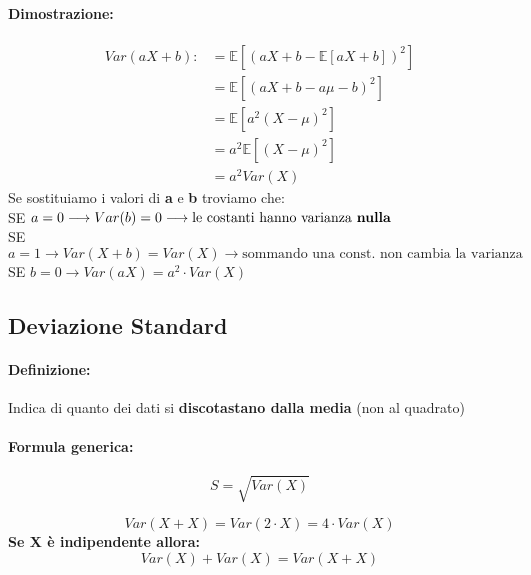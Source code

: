 \documentclass[]{article}
\newcommand{\ev}{\mathbb{E}[X]}
\renewcommand{\ev}[1]{\mathbb{E}[#1]}
\newcommand{\definizione}{\paragraph{Definizione:}}
\newcommand{\formula}{\paragraph{Formula generica:}}
\begin{document}
    \paragraph{Dimostrazione:}
    \begin{equation*}
        \begin{split}
            Var(aX + b) :&= \ev{(aX + b - \ev{aX + b})^2} \\
            & = \ev{(aX + b -a\mu - b)^2} \\
            & = \ev{a^2(X-\mu)^2} \\
            & = a^2 \ev{(X - \mu)^2} \\
            & = a^2 Var(X)
        \end{split}
    \end{equation*}
    Se sostituiamo i valori di \textbf{a} e \textbf{b} troviamo che: \\
    SE $a = 0 \longrightarrow Var(b) = 0 \longrightarrow \text{le costanti hanno varianza \textbf{nulla}}$ \\
    SE $a = 1 \longrightarrow Var(X + b) = Var(X) \longrightarrow \text{sommando una const. non cambia la varianza}$ \\
    SE $b = 0 \longrightarrow Var(aX) = a^2 \cdot Var(X)$ \\
    

    \newpage
    \subsection{Deviazione Standard}
    \definizione Indica di quanto dei dati si \textbf{discotastano dalla media} (non al quadrato)

    \formula \[ S = \sqrt{Var(X)} \]

    \[ Var(X + X) = Var(2 \cdot X) = 4 \cdot Var(X) \]
    \linebreak[1]
    \textbf{Se X è indipendente allora:}
    \[ Var(X) + Var(X) = Var(X + X) \]

    \newpage
\end{document}
